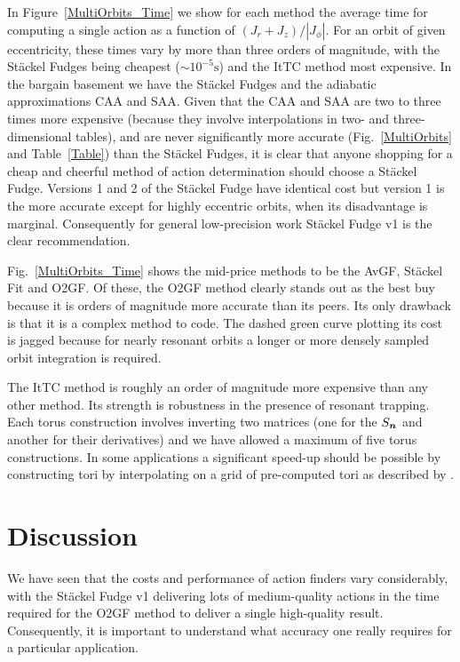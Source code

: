 \documentclass[useAMS,usenatbib,fleqn,a4paper]{mn2e}
\newcommand{\bs}[1]{\bmath{#1}}
\begin{document}
In Figure~\ref{MultiOrbits_Time} we show for each method the average time for
computing a single action as a function of $(J_r+J_z)/|J_\phi|$. For an orbit
of given eccentricity, these times vary by more than three orders of
magnitude, with the St\"ackel Fudges being cheapest ($\sim10^{-5}\mathrm{s}$)
and the ItTC method most expensive. In the bargain basement we have
the St\"ackel Fudges and the adiabatic approximations CAA and SAA.  Given
that the CAA and SAA are two to three times more expensive (because they
involve interpolations in two- and three-dimensional tables), and are never
significantly more accurate (Fig.~\ref{MultiOrbits} and Table~\ref{Table})
than the St\"ackel Fudges, it is clear that anyone shopping for a cheap and
cheerful method of action determination should choose a St\"ackel Fudge.
Versions 1 and 2 of the St\"ackel Fudge have identical cost but version 1 is
the more accurate except for highly eccentric orbits, when its disadvantage
is marginal. Consequently for general low-precision work St\"ackel Fudge v1
is the clear recommendation.

Fig.~\ref{MultiOrbits_Time} shows the mid-price methods to be the AvGF,
St\"ackel Fit and O2GF. Of these, the O2GF method clearly stands out as the
best buy because it is orders of magnitude more accurate than its peers. Its
only drawback is that it is a complex method to code. The dashed green curve
plotting its cost is jagged because for nearly resonant orbits a longer or
more densely sampled orbit integration is required.

The ItTC method is roughly an order of magnitude more expensive than
any other method. Its strength is robustness in the presence of resonant
trapping.  Each torus construction involves inverting two matrices (one for
the $S_{\bs{n}}$ and another for their derivatives) and we have allowed a
maximum of five torus constructions.  In some applications a significant
speed-up should be possible by  constructing tori by interpolating on a grid
of pre-computed tori as described by \cite{BinneyMcMillan2015}.

\section{Discussion}\label{Sect::Discuss}

We have seen that the costs and performance of action finders vary
considerably, with the St\"ackel Fudge v1 delivering lots of medium-quality
actions in the time required for the O2GF method to deliver a single
high-quality result. Consequently, it is important to understand what
accuracy one really requires for a particular application.
\end{document}
